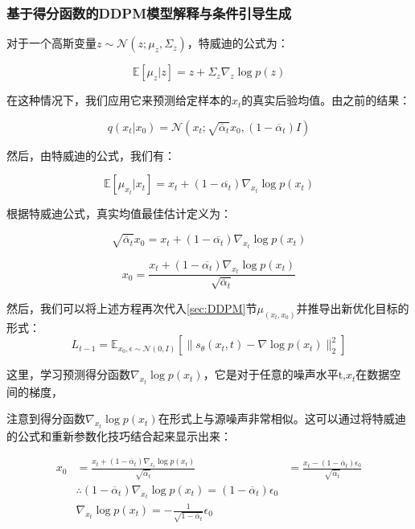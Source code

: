 \subsubsection{基于得分函数的DDPM模型解释与条件引导生成}
对于一个高斯变量$z\sim \mathcal{N} ( z ; \mu_z , \Sigma_z)$，特威迪的公式为：

\begin{equation}\label{eqn-24}
\mathbb{E}[\mu_z | z] = z + \Sigma_z\nabla_z\log{p(z)}
\end{equation}

在这种情况下，我们应用它来预测给定样本的$x_t$的真实后验均值。由之前的结果：

\begin{equation}\label{eqn-25}
      q(x_t|x_0) = \mathcal{N}(x_t;\sqrt{\overline{\alpha}_t}x_0,(1-\overline{\alpha}_t)I)
\end{equation}

然后，由特威迪的公式，我们有：

\begin{equation}\label{eqn-26}
  \mathbb{E}[\mu_{x_t} | x_t] = x_t + (1-\overline{\alpha_t})\nabla_{x_t}\log{p(x_t)}
\end{equation}

根据特威迪公式，真实均值最佳估计定义为：

\begin{equation}\label{eqn-27}
  \sqrt{\overline{\alpha}_t}x_0 = x_t + (1-\overline{\alpha_t})\nabla_{x_t}\log{p(x_t)}
\end{equation}

\begin{equation}\label{eqn-28}
  x_0 =\frac{ x_t + (1-\overline{\alpha_t})\nabla_{x_t}\log{p(x_t)}}{\sqrt{\overline{\alpha}_t}}
\end{equation}

然后，我们可以将上述方程再次代入\ref{sec:DDPM}节$\mu_( x_t , x_0)$并推导出新优化目标的形式：
\begin{equation}\label{eqn-29}
      L_{t-1}=\mathbb{E}_{x_0,\epsilon \sim \mathcal{N}(0,I)}[\lVert s_\theta(x_t,t) - \nabla \log p(x_t)\rVert^2_2]
\end{equation}

这里，学习预测得分函数$\nabla_{x_t}\log{p(x_t)}$，它是对于任意的噪声水平t,$x_t$在数据空间的梯度，

注意到得分函数$\nabla_{x_t}\log{p(x_t)}$在形式上与源噪声非常相似。这可以通过将特威迪的公式和重新参数化技巧结合起来显示出来：

$$\begin{aligned}
      x_0 &= \frac{
            x_t+(1-\overline{\alpha}_t)\nabla_{x_t}\log{p(x_t)}
          }{
            \sqrt{\overline{\alpha}_t}
          }
          &= \frac{
            x_t-(1-\overline{\alpha}_t)\epsilon_0
          }{
            \sqrt{\overline{\alpha}_t}
          } \\
          &\therefore
        (1-\overline{\alpha}_t)\nabla_{x_t}\log{p(x_t)} =
        (1-\overline{\alpha}_t)\epsilon_0 \\
        &\nabla_{x_t}\log{p(x_t)} = -\frac{
          1
        }{
           \sqrt{1-\overline{\alpha}_t}
        }\epsilon_0
\end{aligned}$$

